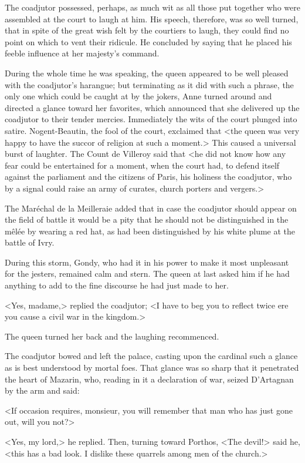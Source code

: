 The coadjutor possessed, perhaps, as much wit as all those put together who were assembled at the court to laugh at him. His speech, therefore, was so well turned, that in spite of the great wish felt by the courtiers to laugh, they could find no point on which to vent their ridicule. He concluded by saying that he placed his feeble influence at her majesty's command.

During the whole time he was speaking, the queen appeared to be well pleased with the coadjutor's harangue; but terminating as it did with such a phrase, the only one which could be caught at by the jokers, Anne turned around and directed a glance toward her favorites, which announced that she delivered up the coadjutor to their tender mercies. Immediately the wits of the court plunged into satire. Nogent-Beautin, the fool of the court, exclaimed that <the queen was very happy to have the succor of religion at such a moment.> This caused a universal burst of laughter. The Count de Villeroy said that <he did not know how any fear could be entertained for a moment, when the court had, to defend itself against the parliament and the citizens of Paris, his holiness the coadjutor, who by a signal could raise an army of curates, church porters and vergers.>

The Maréchal de la Meilleraie added that in case the coadjutor should appear on the field of battle it would be a pity that he should not be distinguished in the mêlée by wearing a red hat, as  had been distinguished by his white plume at the battle of Ivry.

During this storm, Gondy, who had it in his power to make it most unpleasant for the jesters, remained calm and stern. The queen at last asked him if he had anything to add to the fine discourse he had just made to her.

<Yes, madame,> replied the coadjutor; <I have to beg you to reflect twice ere you cause a civil war in the kingdom.>

The queen turned her back and the laughing recommenced.

The coadjutor bowed and left the palace, casting upon the cardinal such a glance as is best understood by mortal foes. That glance was so sharp that it penetrated the heart of Mazarin, who, reading in it a declaration of war, seized D'Artagnan by the arm and said:

<If occasion requires, monsieur, you will remember that man who has just gone out, will you not?>

<Yes, my lord,> he replied. Then, turning toward Porthos, <The devil!> said he, <this has a bad look. I dislike these quarrels among men of the church.>

